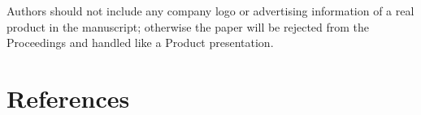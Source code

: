\documentclass[a4paper, 10pt, twocolumn]{article}
\begin{document}
Authors should not include any company logo or advertising information of a real product in the manuscript; otherwise the paper will be rejected from the Proceedings and handled like a Product presentation. 

\renewcommand\refname{}
\section{References}

\begingroup
\RaggedRight 		%

\printbibliography
\endgroup
\end{document}
